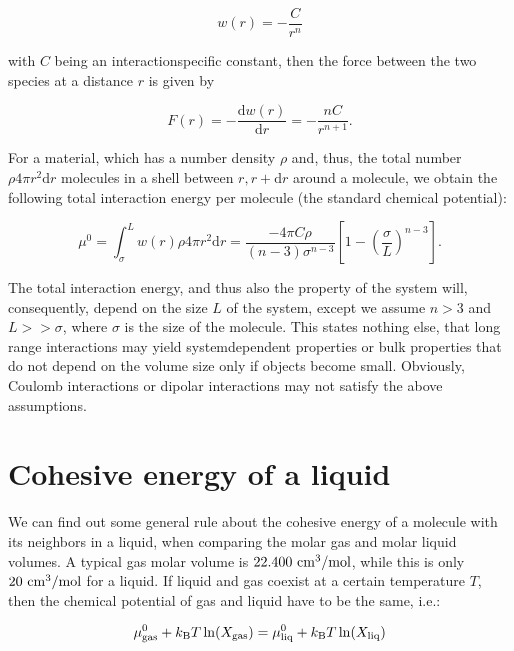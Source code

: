 \documentclass[letterpaper,10pt,english]{sphinxmanual}
\begin{document}
\sphinxAtStartPar
\begin{equation}
w(r)=-\frac{C}{r^n}
\end{equation}

\sphinxAtStartPar
with \(C\) being an interaction\sphinxhyphen{}specific constant, then the force between the two species at a distance \(r\) is given by

\sphinxAtStartPar
\begin{equation}
F(r)=-\frac{\mathrm dw(r)}{\mathrm dr}=-\frac{nC}{r^{n+1}}.
\end{equation}

\sphinxAtStartPar
For a material, which has a number density \(\rho\) and, thus, the total number \(\rho 4πr^2 \mathrm{d}r\) molecules in a shell between \(r,r+\mathrm{d}r\) around a molecule, we obtain the following total interaction energy per molecule (the standard chemical potential):

\sphinxAtStartPar
\begin{equation}
\mu^{0}=\int_{\sigma}^{L}w(r)\rho 4\pi r^2 \mathrm dr=\frac{-4\pi C\rho}{(n-3)\sigma^{n-3}}\left [ 1-\left (\frac{\sigma}{L}\right )^{n-3}\right ].
\end{equation}

\sphinxAtStartPar
The total interaction energy, and thus also the property of the system will, consequently, depend on the size \(L\) of the system, except we assume \(n>3\) and \(L>>σ\), where \(σ\) is the size of the molecule. This states nothing else, that long range interactions may yield system\sphinxhyphen{}dependent properties or bulk properties that do not depend on the volume size only if objects become small. Obviously, Coulomb interactions or dipolar interactions may not satisfy the above
assumptions.


\section{Cohesive energy of a liquid}
\label{\detokenize{notebooks/L7/1_Forces and Interactions:Cohesive-energy-of-a-liquid}}
\sphinxAtStartPar
We can find out some general rule about the cohesive energy of a molecule with its neighbors in a liquid, when comparing the molar gas and molar liquid volumes. A typical gas molar volume is \(22.400~ \rm cm^3/mol\), while this is only \(20~ \rm cm^3/mol\) for a liquid. If liquid and gas coexist at a certain temperature \(T\), then the chemical potential of gas and liquid have to be the same, i.e.:

\sphinxAtStartPar
\begin{equation}
\mu^{0}_{\rm gas}+k_{\rm B}T\ln(X_{\rm gas})=\mu^{0}_{\rm liq}+k_{\rm B}T\ln(X_{\rm liq})
\end{equation}
\end{document}
